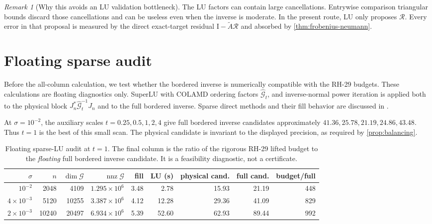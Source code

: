 \documentclass[11pt]{article}
\theoremstyle{definition}
\theoremstyle{remark}
\newtheorem{remark}[theorem]{Remark}
\newcommand{\Id}{\mathrm I}
\newcommand{\Atilde}{\widetilde A}
\newcommand{\Gmat}{\mathcal G}
\newcommand{\Rapp}{\mathcal R}
\begin{document}
\begin{remark}[Why this avoids an LU validation bottleneck]
The LU factors can contain large cancellations.  Entrywise comparison
triangular bounds discard those cancellations and can be useless even when
the inverse is moderate.  In the present route, LU only proposes $\Rapp$.
Every error in that proposal is measured by the direct exact-target residual
$\Id-\Atilde\Rapp$ and absorbed by
\cref{thm:frobenius-neumann}.
\end{remark}


\section{Floating sparse audit}
\label{sec:floating-audit}

Before the all-column calculation, we test whether the bordered inverse is
numerically compatible with the RH-29 budgets.  These calculations are
floating diagnostics only.  SuperLU with COLAMD ordering factors
$\widehat{\Gmat}_t$, and inverse-normal power iteration is applied both to
the physical block $J_n^*\widehat{\Gmat}_t^{-1}J_n$ and to the full bordered
inverse.  Sparse direct methods and their fill behavior are discussed in
\citep{Davis2006,GolubVanLoan2013}.

At $\sigma=10^{-2}$, the auxiliary scales
$t=0.25,0.5,1,2,4$ give full bordered inverse candidates approximately
$41.36,25.78,21.19,24.86,43.48$.  Thus $t=1$ is the best of this small scan.
The physical candidate is invariant to the displayed precision, as required
by \cref{prop:balancing}.

\begin{table}[H]
\centering
\caption{Floating sparse-LU audit at $t=1$.  The final column is the ratio of
the rigorous RH-29 lifted budget to the \emph{floating} full bordered inverse
candidate.  It is a feasibility diagnostic, not a certificate.}
\label{tab:sparse-pilot}
\scriptsize
\begin{tabular}{rrrrrrrrr}
\toprule
$\sigma$ & $n$ & $\dim\Gmat$ & $\operatorname{nnz}\Gmat$ & fill & LU (s)
& physical cand. & full cand. & budget/full\\
\midrule
$10^{-2}$ & 2048 & 4109 & $1.295\times10^6$ & 3.48 & 2.78
& 15.93 & 21.19 & 448\\
$4\times10^{-3}$ & 5120 & 10255 & $3.387\times10^6$ & 4.12 & 12.28
& 29.36 & 41.09 & 829\\
$2\times10^{-3}$ & 10240 & 20497 & $6.934\times10^6$ & 5.39 & 52.60
& 62.93 & 89.44 & 992\\
\bottomrule
\end{tabular}
\end{table}
\end{document}
